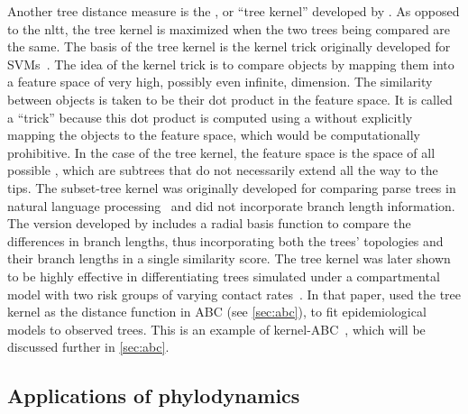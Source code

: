 Another tree distance measure is the , or ``tree
kernel'' developed by \textcite{poon2013mapping}. As opposed to the \gls{nltt},
the tree kernel is maximized when the two trees being compared are the same.
The basis of the tree kernel is the kernel trick originally developed for
\glspl{SVM}~\autocite{burges1998tutorial}. The idea of the kernel trick is to
compare objects by mapping them into a feature space of very high, possibly
even infinite, dimension. The similarity between objects is taken to be their
dot product in the feature space. It is called a ``trick'' because this dot
product is computed using a  without explicitly mapping
the objects to the feature space, which would be computationally prohibitive.
In the case of the tree kernel, the feature space is the space of all possible
, which are subtrees that do not necessarily extend all the
way to the tips. The subset-tree kernel was originally developed for comparing
parse trees in natural language processing~\autocite{collins2002new} and did
not incorporate branch length information. The version developed by
\textcite{poon2013mapping} includes a radial basis function to compare the
differences in branch lengths, thus incorporating both the trees' topologies
and their branch lengths in a single similarity score. The tree kernel was
later shown to be highly effective in differentiating trees simulated under a
compartmental model with two risk groups of varying contact
rates~\autocite{poon2015phylodynamic}. In that paper,
\citeauthor{poon2015phylodynamic} used the tree kernel as the distance function
in \gls{ABC} (see \cref{sec:abc}), to fit epidemiological models to observed
trees. This is an example of kernel-ABC~\autocite{nakagome2013kernel}, which
will be discussed further in \cref{sec:abc}.

\subsection{Applications of phylodynamics}
\label{subsec:phyloapp}

